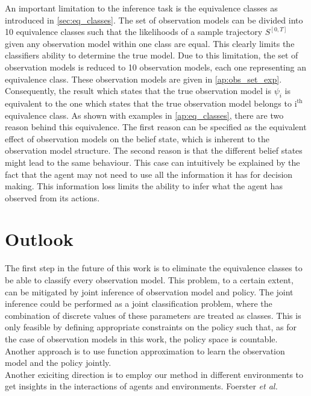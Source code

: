 An important limitation to the inference task is the equivalence classes as introduced in \cref{sec:eq_classes}. The set of observation models can be divided into 10 equivalence classes such that the likelihoods of a sample trajectory $ S^{[0,T]} $ given any observation model within one class are equal. This clearly limits the classifiers ability to determine the true model. Due to this limitation, the set of observation models is reduced to 10 observation models, each one representing an equivalence class. These observation models are given in \cref{ap:obs_set_exp}. Consequently, the result which states that the true observation model is $ \psi_i $ is equivalent to the one which states that the true observation model belongs to $ \text{i}^{\text{th}} $ equivalence class. As shown with examples in \cref{ap:eq_classes}, there are two reason behind this equivalence. The first reason can be specified as the equivalent effect of observation models on the belief state, which is inherent to the observation model structure. The second reason is that the different belief states might lead to the same behaviour. This case can intuitively be explained by the fact that the agent may not need to use all the information it has for decision making. This information loss limits the ability to infer what the agent has observed from its actions.\\

\chapter{Outlook}
\label{chap:6}
The first step in the future of this work is to eliminate the equivalence classes to be able to classify every observation model. This problem, to a certain extent, can be mitigated by joint inference of observation model and policy. The joint inference could be performed as a joint classification problem, where the combination of discrete values of these parameters are treated as classes. This is only feasible by defining appropriate constraints on the policy such that, as for the case of observation models in this work, the policy space is countable. Another approach is to use function approximation to learn the observation model and the policy jointly.\\ 

Another exiciting direction is to employ our method in different environments to get insights in the interactions of agents and environments. 
Foerster \textit{et al.} \cite{Foerster2016}\\

